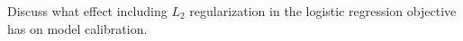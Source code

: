 \item {}
Discuss what effect including $L_2$ regularization in the logistic regression
objective has on model calibration.
